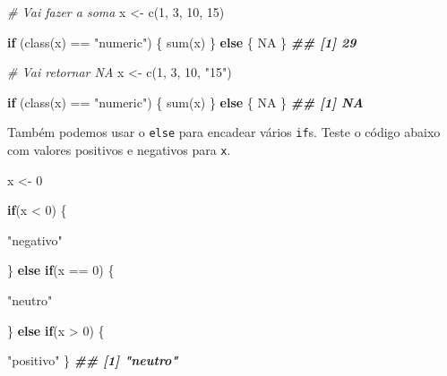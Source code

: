 \documentclass[
]{book}
\newenvironment{Shaded}{\begin{snugshade}}{\end{snugshade}}
\newcommand{\CommentTok}[1]{\textcolor[rgb]{0.56,0.35,0.01}{\textit{#1}}}
\newcommand{\ConstantTok}[1]{\textcolor[rgb]{0.00,0.00,0.00}{#1}}
\newcommand{\ControlFlowTok}[1]{\textcolor[rgb]{0.13,0.29,0.53}{\textbf{#1}}}
\newcommand{\DecValTok}[1]{\textcolor[rgb]{0.00,0.00,0.81}{#1}}
\newcommand{\DocumentationTok}[1]{\textcolor[rgb]{0.56,0.35,0.01}{\textbf{\textit{#1}}}}
\newcommand{\FunctionTok}[1]{\textcolor[rgb]{0.00,0.00,0.00}{#1}}
\newcommand{\NormalTok}[1]{#1}
\newcommand{\OtherTok}[1]{\textcolor[rgb]{0.56,0.35,0.01}{#1}}
\newcommand{\SpecialCharTok}[1]{\textcolor[rgb]{0.00,0.00,0.00}{#1}}
\newcommand{\StringTok}[1]{\textcolor[rgb]{0.31,0.60,0.02}{#1}}
\begin{document}
\begin{Shaded}
\begin{Highlighting}[]
\CommentTok{\# Vai fazer  a soma}
\NormalTok{x }\OtherTok{\textless{}{-}} \FunctionTok{c}\NormalTok{(}\DecValTok{1}\NormalTok{, }\DecValTok{3}\NormalTok{, }\DecValTok{10}\NormalTok{, }\DecValTok{15}\NormalTok{)}

\ControlFlowTok{if}\NormalTok{ (}\FunctionTok{class}\NormalTok{(x) }\SpecialCharTok{==} \StringTok{"numeric"}\NormalTok{) \{}
  \FunctionTok{sum}\NormalTok{(x)}
\NormalTok{\} }\ControlFlowTok{else}\NormalTok{ \{}
  \ConstantTok{NA}
\NormalTok{\}}
\DocumentationTok{\#\# [1] 29}

\CommentTok{\# Vai retornar NA}
\NormalTok{x }\OtherTok{\textless{}{-}} \FunctionTok{c}\NormalTok{(}\DecValTok{1}\NormalTok{, }\DecValTok{3}\NormalTok{, }\DecValTok{10}\NormalTok{, }\StringTok{"15"}\NormalTok{)}

\ControlFlowTok{if}\NormalTok{ (}\FunctionTok{class}\NormalTok{(x) }\SpecialCharTok{==} \StringTok{"numeric"}\NormalTok{) \{}
  \FunctionTok{sum}\NormalTok{(x)}
\NormalTok{\} }\ControlFlowTok{else}\NormalTok{ \{}
  \ConstantTok{NA}
\NormalTok{\}}
\DocumentationTok{\#\# [1] NA}
\end{Highlighting}
\end{Shaded}

Também podemos usar o \texttt{else} para encadear vários \texttt{if}s. Teste o código abaixo com valores positivos e negativos para \texttt{x}.

\begin{Shaded}
\begin{Highlighting}[]
\NormalTok{x }\OtherTok{\textless{}{-}} \DecValTok{0}

\ControlFlowTok{if}\NormalTok{(x }\SpecialCharTok{\textless{}} \DecValTok{0}\NormalTok{) \{}
  
  \StringTok{"negativo"}
  
\NormalTok{\} }\ControlFlowTok{else} \ControlFlowTok{if}\NormalTok{(x }\SpecialCharTok{==} \DecValTok{0}\NormalTok{) \{}
  
  \StringTok{"neutro"}
  
\NormalTok{\} }\ControlFlowTok{else} \ControlFlowTok{if}\NormalTok{(x }\SpecialCharTok{\textgreater{}} \DecValTok{0}\NormalTok{) \{}
  
  \StringTok{"positivo"}
\NormalTok{\}}
\DocumentationTok{\#\# [1] "neutro"}
\end{Highlighting}
\end{Shaded}
\end{document}
